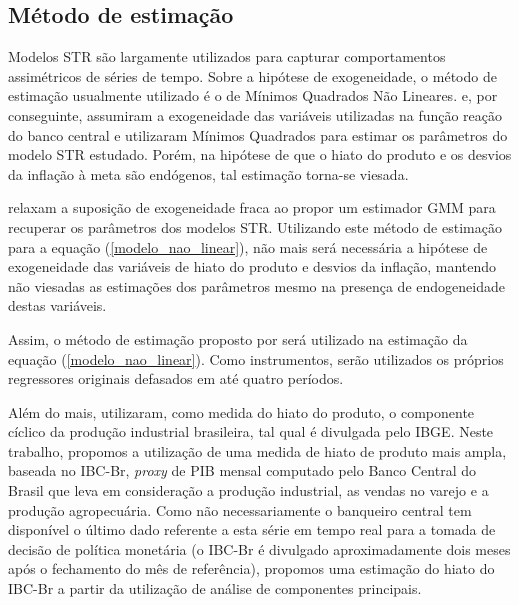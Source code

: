 \documentclass[
	article,			%
	11pt,				%
	oneside,			%
	a4paper,			%
	english,			%
	brazil,				%
	]{abntex2}
\begin{document}
	\subsection{Método de estimação} \label{secao_estimacao}
	
	Modelos STR são largamente utilizados para capturar comportamentos assimétricos de séries de tempo. Sobre a hipótese de exogeneidade, o método de estimação usualmente utilizado é o de Mínimos Quadrados Não Lineares.  e, por conseguinte,  assumiram a exogeneidade das variáveis utilizadas na função reação do banco central e utilizaram Mínimos Quadrados para estimar os parâmetros do modelo STR estudado. Porém, na hipótese de que o hiato do produto e os desvios da inflação à meta são endógenos, tal estimação torna-se viesada.
	
	 relaxam a suposição de exogeneidade fraca ao propor um estimador GMM para recuperar os parâmetros dos modelos STR.	Utilizando este método de estimação para a equação (\ref{modelo_nao_linear}), não mais será necessária a hipótese de exogeneidade das variáveis de hiato do produto e desvios da inflação, mantendo não viesadas as estimações dos parâmetros mesmo na presença de endogeneidade destas variáveis.
	
	Assim, o método de estimação proposto por  será utilizado na estimação da equação (\ref{modelo_nao_linear}). Como instrumentos, serão utilizados os próprios regressores originais defasados em até quatro períodos.
	
	Além do mais,  utilizaram, como medida do hiato do produto, o componente cíclico da produção industrial brasileira, tal qual é divulgada pelo IBGE. Neste trabalho, propomos a utilização de uma medida de hiato de produto mais ampla, baseada no IBC-Br, \textsl{proxy} de PIB mensal computado pelo Banco Central do Brasil que leva em consideração a produção industrial, as vendas no varejo e a produção agropecuária. Como não necessariamente o banqueiro central tem disponível o último dado referente a esta série em tempo real para a tomada de decisão de política monetária (o IBC-Br é divulgado aproximadamente dois meses após o fechamento do mês de referência), propomos uma estimação do hiato do IBC-Br a partir da utilização de análise de componentes principais.
	
	
	
\end{document}
